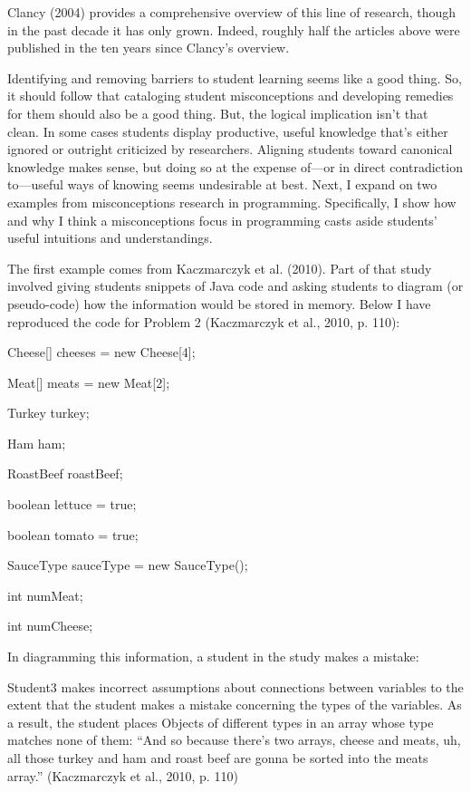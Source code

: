 Clancy (2004) provides a comprehensive overview of this line of
research, though in the past decade it has only grown. Indeed, roughly
half the articles above were published in the ten years since Clancy's
overview.

Identifying and removing barriers to student learning seems like a good
thing. So, it should follow that cataloging student misconceptions and
developing remedies for them should also be a good thing. But, the
logical implication isn't that clean. In some cases students display
productive, useful knowledge that's either ignored or outright
criticized by researchers. Aligning students toward canonical knowledge
makes sense, but doing so at the expense of---or in direct contradiction
to---useful ways of knowing seems undesirable at best. Next, I expand on
two examples from misconceptions research in programming. Specifically,
I show how and why I think a misconceptions focus in programming casts
aside students' useful intuitions and understandings.

The first example comes from Kaczmarczyk et al. (2010). Part of that
study involved giving students snippets of Java code and asking students
to diagram (or pseudo-code) how the information would be stored in
memory. Below I have reproduced the code for Problem 2 (Kaczmarczyk et
al., 2010, p. 110):

Cheese{[}{]} cheeses = new Cheese{[}4{]};

Meat{[}{]} meats = new Meat{[}2{]};

Turkey turkey;

Ham ham;

RoastBeef roastBeef;

boolean lettuce = true;

boolean tomato = true;

SauceType sauceType = new SauceType();

int numMeat;

int numCheese;

In diagramming this information, a student in the study makes a mistake:

Student3 makes incorrect assumptions about connections between variables
to the extent that the student makes a mistake concerning the types of
the variables. As a result, the student places Objects of different
types in an array whose type matches none of them: ``And so because
there's two arrays, cheese and meats, uh, all those turkey and ham and
roast beef are gonna be sorted into the meats array.'' (Kaczmarczyk et
al., 2010, p. 110)

